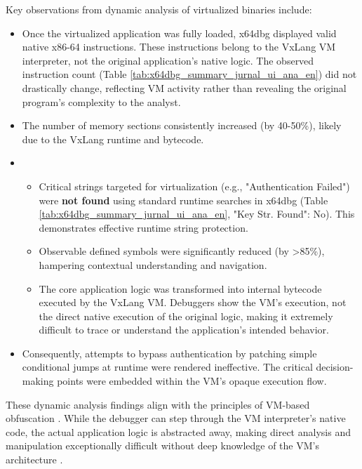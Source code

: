 Key observations from dynamic analysis of virtualized binaries include:
\begin{itemize}
    \item {} Once the virtualized application was fully loaded, x64dbg displayed valid native x86-64 instructions. These instructions belong to the VxLang VM interpreter, not the original application's native logic. The observed instruction count (Table \ref{tab:x64dbg_summary_jurnal_ui_ana_en}) did not drastically change, reflecting VM activity rather than revealing the original program's complexity to the analyst.
    \item {} The number of memory sections consistently increased (by 40-50\%), likely due to the VxLang runtime and bytecode.
    \item {}
        \begin{itemize}
            \item {} Critical strings targeted for virtualization (e.g., "Authentication Failed") were \textbf{not found} using standard runtime searches in x64dbg (Table \ref{tab:x64dbg_summary_jurnal_ui_ana_en}, "Key Str. Found": No). This demonstrates effective runtime string protection.
            \item {} Observable defined symbols were significantly reduced (by >85\%), hampering contextual understanding and navigation.
            \item {} The core application logic was transformed into internal bytecode executed by the VxLang VM. Debuggers show the VM's execution, not the direct native execution of the original logic, making it extremely difficult to trace or understand the application's intended behavior.
        \end{itemize}
    \item {} Consequently, attempts to bypass authentication by patching simple conditional jumps at runtime were rendered ineffective. The critical decision-making points were embedded within the VM's opaque execution flow.
\end{itemize}
These dynamic analysis findings align with the principles of VM-based obfuscation \cite{Sikorski2012, Ore06}. While the debugger can step through the VM interpreter's native code, the actual application logic is abstracted away, making direct analysis and manipulation exceptionally difficult without deep knowledge of the VM's architecture \cite{Salwan2018SymbolicDeobfuscation}.

